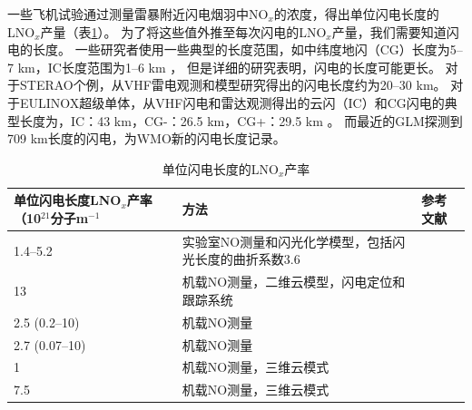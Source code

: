 一些飞机试验通过测量雷暴附近闪电烟羽中NO$_x$的浓度，得出单位闪电长度的LNO$_x$产量（表\ref{table:LNOx/length}）。
为了将这些值外推至每次闪电的LNO$_x$产量，我们需要知道闪电的长度。
一些研究者使用一些典型的长度范围，如中纬度地闪（CG）长度为5--7 km，IC长度范围为1--6 km \citep{Price.1997b}，
但是详细的研究表明，闪电的长度可能更长\citep{Defer.2001,Thery.2001,Peterson.2020b}。
对于STERAO个例，从VHF雷电观测和模型研究得出的闪电长度约为20--30 km\citep{Defer.2001}。
对于EULINOX超级单体，从VHF闪电和雷达观测得出的云闪（IC）和CG闪电的典型长度为，IC：43 km，CG-：26.5 km，CG+：29.5 km \citep{Dotzek.2000}。
而最近的GLM探测到709 km长度的闪电，为WMO新的闪电长度记录\citep{Peterson.2020b}。

{
\centering
\footnotesize
\begin{longtable}
{|p{15em}|p{13em}|p{10em}|}
\caption{单位闪电长度的LNO$_x$产率}
\label{table:LNOx/length} \\
\hline
单位闪电长度LNO$_x$产率（10$^{21}$分子m$^{-1}$   & 方法                          & 参考文献 \\ \hline
1.4--5.2                                     & 实验室NO测量和闪光化学模型，包括闪光长度的曲折系数3.6   & \citet{Wang.1998} \\ \hline
13                                           & 机载NO测量，二维云模型，闪电定位和跟踪系统  & \citet{Holler.1999} \\ \hline
2.5 (0.2--10)                                & 机载NO测量                     & \citet{Stith.1999} \\ \hline
2.7 (0.07--10)                               & 机载NO测量                     & \citet{Huntrieser.2002} \\ \hline
1                                            & 机载NO测量，三维云模式           & \citet{Skamarock.2003} \\ \hline
7.5                                          & 机载NO测量，三维云模式           & \citet{Ott.2007} \\ \hline
\end{longtable}\par
}

